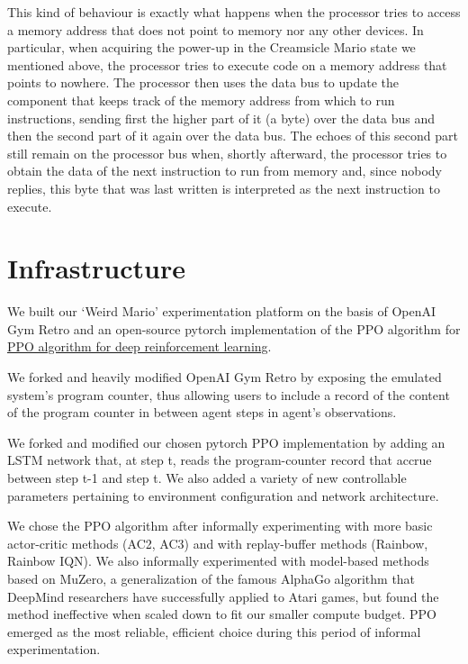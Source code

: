 \documentclass[]{article}
\begin{document}
This kind of behaviour is exactly what happens when the processor tries
to access a memory address that does not point to memory nor any other
devices. In particular, when acquiring the power-up in the Creamsicle
Mario state we mentioned above, the processor tries to execute code on a
memory address that points to nowhere. The processor then uses the data
bus to update the component that keeps track of the memory address from
which to run instructions, sending first the higher part of it (a byte)
over the data bus and then the second part of it again over the data
bus. The echoes of this second part still remain on the processor bus
when, shortly afterward, the processor tries to obtain the data of the
next instruction to run from memory and, since nobody replies, this byte
that was last written is interpreted as the next instruction to execute.

\hypertarget{infrastructure}{%
\section{Infrastructure}\label{infrastructure}}

We built our `Weird Mario' experimentation platform on the basis of
OpenAI Gym Retro and an open-source pytorch implementation of the PPO
algorithm for
\href{https://github.com/ikostrikov/pytorch-a2c-ppo-acktr-gail}{PPO
algorithm for deep reinforcement learning}.

We forked and heavily modified OpenAI Gym Retro by exposing the emulated
system's program counter, thus allowing users to include a record of the
content of the program counter in between agent steps in agent's
observations.

We forked and modified our chosen pytorch PPO implementation by adding
an LSTM network that, at step t, reads the program-counter record that
accrue between step t-1 and step t. We also added a variety of new
controllable parameters pertaining to environment configuration and
network architecture.

We chose the PPO algorithm after informally experimenting with more
basic actor-critic methods (AC2, AC3) and with replay-buffer methods
(Rainbow, Rainbow IQN). We also informally experimented with model-based
methods based on MuZero, a generalization of the famous AlphaGo
algorithm that DeepMind researchers have successfully applied to Atari
games, but found the method ineffective when scaled down to fit our
smaller compute budget. PPO emerged as the most reliable, efficient
choice during this period of informal experimentation.
\end{document}
